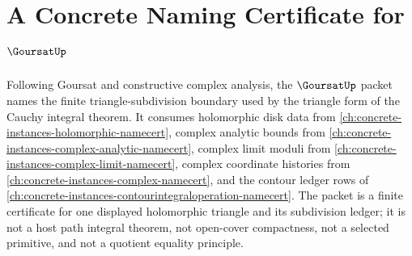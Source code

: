 \chapter{A Concrete Naming Certificate for $\GoursatUp$}
\label{ch:concrete-instances-goursat-namecert}

Following Goursat and constructive complex analysis, the $\GoursatUp$ packet names the finite triangle-subdivision boundary used by the triangle form of the Cauchy integral theorem. It consumes holomorphic disk data from \autoref{ch:concrete-instances-holomorphic-namecert}, complex analytic bounds from \autoref{ch:concrete-instances-complex-analytic-namecert}, complex limit moduli from \autoref{ch:concrete-instances-complex-limit-namecert}, complex coordinate histories from \autoref{ch:concrete-instances-complex-namecert}, and the contour ledger rows of \autoref{ch:concrete-instances-contourintegraloperation-namecert}. The packet is a finite certificate for one displayed holomorphic triangle and its subdivision ledger; it is not a host path integral theorem, not open-cover compactness, not a selected primitive, and not a quotient equality principle.


